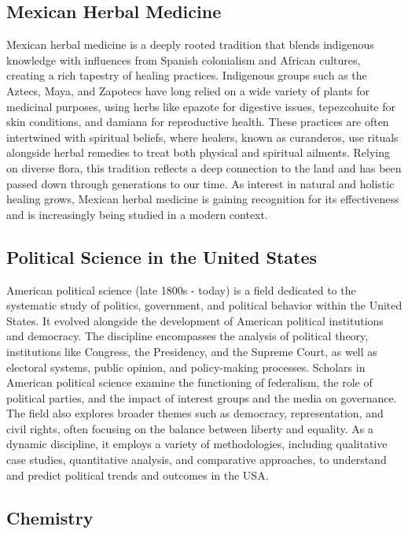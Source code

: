\documentclass[12pt]{article}
\begin{document}
\subsection{Mexican Herbal Medicine}

Mexican herbal medicine is a deeply rooted tradition that blends indigenous knowledge with influences from Spanish colonialism and African cultures, creating a rich tapestry of healing practices. Indigenous groups such as the Aztecs, Maya, and Zapotecs have long relied on a wide variety of plants for medicinal purposes, using herbs like epazote for digestive issues, tepezcohuite for skin conditions, and damiana for reproductive health. These practices are often intertwined with spiritual beliefs, where healers, known as curanderos, use rituals alongside herbal remedies to treat both physical and spiritual ailments. Relying on diverse flora, this tradition reflects a deep connection to the land and has been passed down through generations to our time. As interest in natural and holistic healing grows, Mexican herbal medicine is gaining recognition for its effectiveness and is increasingly being studied in a modern context.

\subsection{Political Science in the United States}

American political science (late 1800s - today) is a field dedicated to the systematic study of politics, government, and political behavior within the United States. It evolved alongside the development of American political institutions and democracy. The discipline encompasses the analysis of political theory, institutions like Congress, the Presidency, and the Supreme Court, as well as electoral systems, public opinion, and policy-making processes. Scholars in American political science examine the functioning of federalism, the role of political parties, and the impact of interest groups and the media on governance. The field also explores broader themes such as democracy, representation, and civil rights, often focusing on the balance between liberty and equality. As a dynamic discipline, it employs a variety of methodologies, including qualitative case studies, quantitative analysis, and comparative approaches, to understand and predict political trends and outcomes in the USA.

\subsection{Chemistry}
\end{document}

